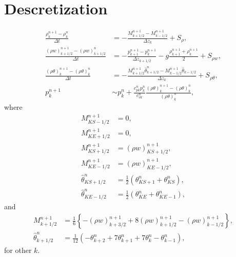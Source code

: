 \section{Descretization}
\begin{align}
  \frac{\rho_k^{n+1}-\rho_k^n}{\Delta t}
  &= -\frac{M_{k+1/2}^{n+1}-M_{k-1/2}^{n+1}}{\Delta z_k} + S_\rho, \\
  \frac{(\rho w)_{k+1/2}^{n+1}-(\rho w)_{k+1/2}^n}{\Delta t}
  &= -\frac{p_{k+1}^{n+1}-p_k^{n+1}}{\Delta z_{k+1/2}} -g\frac{\rho_{k+1}^{n+1}+\rho_k^{n+1}}{2} + S_{\rho w}, \\
  \frac{(\rho\theta)_k^{n+1}-(\rho\theta)_k^n}{\Delta t}
  &= -\frac{M_{k+1/2}^{n+1}\hat{\theta}_{k+1/2}^n-M_{k-1/2}^{n+1}\hat{\theta}_{k-1/2}}{\Delta z_k} + S_{\rho\theta}, \\
  p_k^{n+1} &\sim p_k^n + \frac{c_{p k}^np_k^n}{c_{v k}^n}\frac{(\rho\theta)_k^{n+1}-(\rho\theta)_k^n}{(\rho\theta)_k^n},
\end{align}
where
\begin{align}
  M_{KS-1/2}^{n+1} &= 0, \\
  M_{KE+1/2}^{n+1} &= 0, \\
  M_{KS+1/2}^{n+1} &= (\rho w)_{KS+1/2}^{n+1}, \\
  M_{KE-1/2}^{n+1} &= (\rho w)_{KE-1/2}^{n+1}, \\
  \hat\theta_{KS+1/2}^n &= \frac{1}{2}(\theta_{KS+1}^n+\theta_{KS}^n), \\
  \hat\theta_{KE-1/2}^n &= \frac{1}{2}(\theta_{KE}^n+\theta_{KE-1}^n),
\end{align}
and
\begin{align}
  M_{k+1/2}^{n+1}
  &= \frac{1}{6}\left\{-(\rho w)_{k+3/2}^{n+1}+8(\rho w)_{k+1/2}^{n+1}-(\rho w)_{k-1/2}^{n+1}\right\}, \\
  \hat{\theta}_{k+1/2}^n
  &= \frac{1}{12}(-\theta_{k+2}^n+7\theta_{k+1}^n+7\theta_k^n-\theta_{k-1}^n),
\end{align}
for other $k$.


